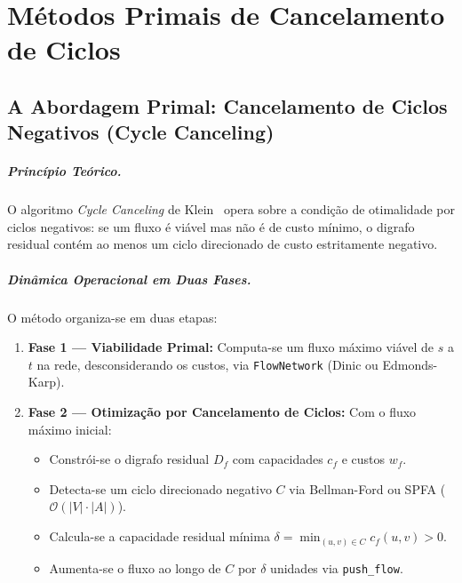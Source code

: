 \chapter{Métodos Primais de Cancelamento de Ciclos}\label{sec:mcf_primal}
\label{sec:algoritmos_mcf}

\section{A Abordagem Primal: Cancelamento de Ciclos Negativos (Cycle Canceling)}\label{sec:cycle_canceling}

\paragraph{Princípio Teórico.}
O algoritmo \textit{Cycle Canceling} de Klein~\cite{klein1967primal} opera sobre a condição de otimalidade por ciclos negativos: se um fluxo é viável mas não é de custo mínimo, o digrafo residual contém ao menos um ciclo direcionado de custo estritamente negativo.

\paragraph{Dinâmica Operacional em Duas Fases.}
O método organiza-se em duas etapas:

\begin{enumerate}
    \item \textbf{Fase 1 --- Viabilidade Primal:} Computa-se um fluxo máximo viável de $s$ a $t$ na rede, desconsiderando os custos, via \lstinline{FlowNetwork} (Dinic ou Edmonds-Karp).

    \item \textbf{Fase 2 --- Otimização por Cancelamento de Ciclos:} Com o fluxo máximo inicial:
    \begin{itemize}
        \item Constrói-se o digrafo residual $D_f$ com capacidades $c_f$ e custos $w_f$.
        \item Detecta-se um ciclo direcionado negativo $C$ via Bellman-Ford ou SPFA ($\mathcal{O}(|V| \cdot |A|)$).
        \item Calcula-se a capacidade residual mínima $\delta = \min_{(u,v) \in C} c_f(u,v) > 0$.
        \item Aumenta-se o fluxo ao longo de $C$ por $\delta$ unidades via \lstinline{push_flow}.
    \end{itemize}
\end{enumerate}


